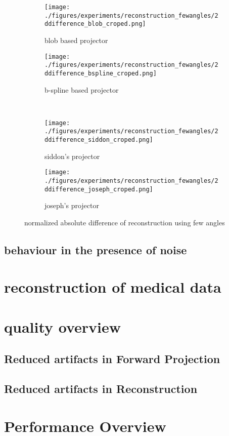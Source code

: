 \begin{figure}[h]
	\centering
	\begin{subfigure}[b]{0.45\textwidth}
		\centering
		\texttt{[image: ./figures/experiments/reconstruction\_fewangles/2ddifference\_blob\_croped.png]}
		\caption{blob based projector}%
		\label{fig:reconstruction_diff_fewangles_blob}
	\end{subfigure}
	\begin{subfigure}[b]{0.45\textwidth}
		\centering
		\texttt{[image: ./figures/experiments/reconstruction\_fewangles/2ddifference\_bspline\_croped.png]}
		\caption{b-spline based projector}%
		\label{fig:reconstruction_diff_fewangles_bspline}
	\end{subfigure} \\
	\begin{subfigure}[b]{0.45\textwidth}
		\centering
		\texttt{[image: ./figures/experiments/reconstruction\_fewangles/2ddifference\_siddon\_croped.png]}
		\caption{siddon's projector}%
		\label{fig:reconstruction_diff_fewangles_siddon}
	\end{subfigure}
	\begin{subfigure}[b]{0.45\textwidth}
		\centering
		\texttt{[image: ./figures/experiments/reconstruction\_fewangles/2ddifference\_joseph\_croped.png]}
		\caption{joseph's projector}%
		\label{fig:reconstruction_diff_fewangles_joseph}
	\end{subfigure}
	\caption{normalized absolute difference of reconstruction using few angles}%
	\label{fig:reconstruction_diff_fewangles}
\end{figure}

\subsection{behaviour in the presence of noise}

\section{reconstruction of medical data}\label{sec:experiments_medical_projection}


\section{quality overview}\label{sec:experiments_quality_projection}

\subsection{Reduced artifacts in Forward Projection}\label{sec:experiments_artifacts_forward}

\subsection{Reduced artifacts in Reconstruction}\label{sec:experiments_artifacts_reconstruction}

\section{Performance Overview}\label{sec:experiments_performance_projection}
